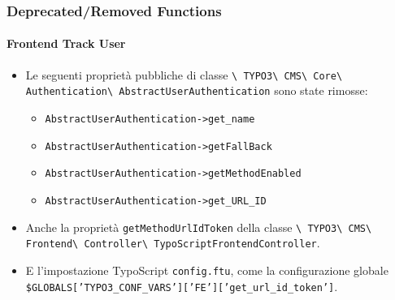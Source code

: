 
\begin{frame}[fragile]
	\frametitle{Deprecated/Removed Functions}
	\framesubtitle{Frontend Track User}

	\begin{itemize}

		\item Le seguenti proprietà pubbliche di classe\newline
			\smaller\texttt{\textbackslash
				TYPO3\textbackslash
				CMS\textbackslash
				Core\textbackslash
				Authentication\textbackslash
				AbstractUserAuthentication}
			\normalsize\newline
			sono state rimosse:

			\begin{itemize}\smaller
				\item \texttt{AbstractUserAuthentication->get\_name}
				\item \texttt{AbstractUserAuthentication->getFallBack}
				\item \texttt{AbstractUserAuthentication->getMethodEnabled}
				\item \texttt{AbstractUserAuthentication->get\_URL\_ID}
			\end{itemize}\normalsize

		\item Anche la proprietà \texttt{getMethodUrlIdToken} della classe\newline
			\smaller\texttt{\textbackslash
				TYPO3\textbackslash
				CMS\textbackslash
				Frontend\textbackslash
				Controller\textbackslash
				TypoScriptFrontendController}.
			\normalsize

		\item E l'impostazione TypoScript \texttt{config.ftu},
			come la configurazione globale
			{\fontsize{8}{8} \selectfont \texttt{\$GLOBALS['TYPO3\_CONF\_VARS']['FE']['get\_url\_id\_token']}.}

	\end{itemize}

\end{frame}


